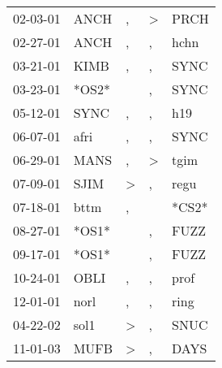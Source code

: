 \begin{supertabular}{lllll}
 02-03-01 &   ANCH &             , &  \textgreater &   PRCH \\
 02-27-01 &   ANCH &             , &             , &   hchn \\
 03-21-01 &   KIMB &             , &             , &   SYNC \\
 03-23-01 &  *OS2* &               &             , &   SYNC \\
 05-12-01 &   SYNC &             , &             , &    h19 \\
 06-07-01 &   afri &             , &             , &   SYNC \\
 06-29-01 &   MANS &             , &  \textgreater &   tgim \\
 07-09-01 &   SJIM &  \textgreater &             , &   regu \\
 07-18-01 &   bttm &             , &               &  *CS2* \\
 08-27-01 &  *OS1* &               &             , &   FUZZ \\
 09-17-01 &  *OS1* &               &             , &   FUZZ \\
 10-24-01 &   OBLI &             , &             , &   prof \\
 12-01-01 &   norl &             , &             , &   ring \\
 04-22-02 &   sol1 &  \textgreater &             , &   SNUC \\
 11-01-03 &   MUFB &  \textgreater &             , &   DAYS \\
\end{supertabular}
